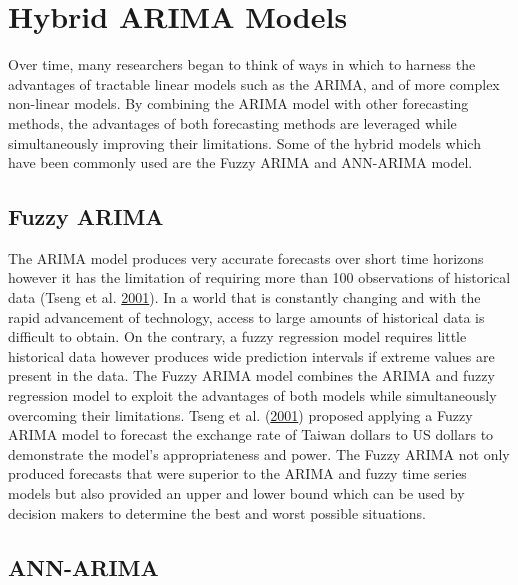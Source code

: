 \documentclass[12pt,preprint, authoryear]{elsarticle}
\numberwithin{equation}{section}
\numberwithin{figure}{section}
\numberwithin{table}{section}
\begin{document}
\section{Hybrid ARIMA Models}\label{hybrid-arima-models}

Over time, many researchers began to think of ways in which to harness
the advantages of tractable linear models such as the ARIMA, and of more
complex non-linear models. By combining the ARIMA model with other
forecasting methods, the advantages of both forecasting methods are
leveraged while simultaneously improving their limitations. Some of the
hybrid models which have been commonly used are the Fuzzy ARIMA and
ANN-ARIMA model.

\subsection{Fuzzy ARIMA}\label{fuzzy-arima}

The ARIMA model produces very accurate forecasts over short time
horizons however it has the limitation of requiring more than 100
observations of historical data (Tseng et al.
\protect\hyperlink{ref-tseng2001}{2001}). In a world that is constantly
changing and with the rapid advancement of technology, access to large
amounts of historical data is difficult to obtain. On the contrary, a
fuzzy regression model requires little historical data however produces
wide prediction intervals if extreme values are present in the data. The
Fuzzy ARIMA model combines the ARIMA and fuzzy regression model to
exploit the advantages of both models while simultaneously overcoming
their limitations. Tseng et al.
(\protect\hyperlink{ref-tseng2001}{2001}) proposed applying a Fuzzy
ARIMA model to forecast the exchange rate of Taiwan dollars to US
dollars to demonstrate the model's appropriateness and power. The Fuzzy
ARIMA not only produced forecasts that were superior to the ARIMA and
fuzzy time series models but also provided an upper and lower bound
which can be used by decision makers to determine the best and worst
possible situations.

\subsection{ANN-ARIMA}\label{ann-arima}
\end{document}
